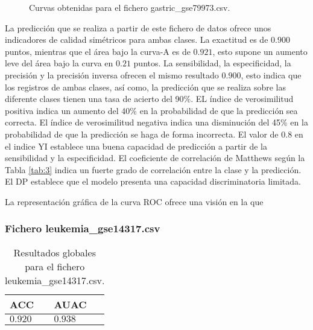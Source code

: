 \bigbreak

\begin{figure}[htp]
    \centering
    \caption{Curvas obtenidas para el fichero gastric\_gse79973.csv.}
    \label{fig:14}
\end{figure}


La predicción que se realiza a partir de este fichero de datos ofrece unos indicadores de calidad simétricos para ambas clases. La exactitud es de $0.900$ puntos, mientras que el área bajo la curva-A es de $0.921$, esto supone un aumento leve del área bajo la curva en $0.21$ puntos. La sensibilidad, la especificidad, la precisión y la precisión inversa ofrecen el mismo resultado $0.900$, esto indica que los registros de ambas clases, así como, la predicción que se realiza sobre las diferente clases tienen una tasa de acierto del 90\%. EL índice de verosimilitud positiva indica un aumento del 40\% en la probabilidad de que la predicción sea correcta. El índice de verosimilitud negativa indica una disminución del 45\% en la probabilidad de que la predicción se haga de forma incorrecta. El valor de $0.8$ en el indice YI establece una buena capacidad de predicción a partir de la sensibilidad y la especificidad. El coeficiente de correlación de Matthews según la Tabla \ref{tab:3} indica un fuerte grado de correlación entre la clase y la predicción. El DP establece que el modelo presenta una capacidad discriminatoria limitada.

La representación gráfica de la curva ROC ofrece una visión en la que 

\clearpage


\subsubsection{Fichero leukemia\_gse14317.csv}

\begin{table}[htp]
    \small
    \centering
    \begin{tabularx}{\columnwidth}{Y Y}
        ACC       & AUAC    \\\hline
        $0.920$   & $0.938$ \\\hline
    \end{tabularx}
    \caption{Resultados globales para el fichero leukemia\_gse14317.csv.}
    \label{tab:20}
\end{table}


